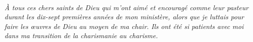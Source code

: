 \newpage
\mbox{}
\vfill
\parbox{4in}{
\begin{center}
\HRule \\[0.4cm]
\emph{À tous ces chers saints de Dieu qui m'ont aimé et encouragé comme leur
 pasteur durant les dix-sept premières années de mon ministère, alors que je
 luttais pour faire les œuvres de Dieu au moyen de ma chair. Ils ont été
 si patients avec moi dans ma transition de la \emph{charismanie}
 au \emph{charisme}.}
\HRule \\[1.5cm]
\end{center}
}
\vfill
\mbox{}
\newpage

